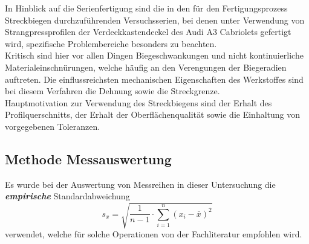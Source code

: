 \documentclass[12pt,a4paper,parskip,twoside,BCOR5mm,headsepline]{scrartcl}
\begin{document}
In Hinblick auf die Serienfertigung sind die in den für den Fertigungsprozess  Streckbiegen durchzuführenden Versuchsserien, bei denen unter Verwendung von Strangpressprofilen der Verdeckkastendeckel des Audi A3 Cabriolets gefertigt wird, spezifische Problembereiche besonders zu beachten.\\
Kritisch sind hier vor allen Dingen Biegeschwankungen und nicht kontinuierliche Materialeinschnürungen,  welche häufig an den Verengungen der Biegeradien auftreten. Die einflussreichsten mechanischen Eigenschaften des Werkstoffes sind bei diesem Verfahren die Dehnung sowie die Streckgrenze.\\
Hauptmotivation zur Verwendung des Streckbiegens sind der Erhalt des Profilquerschnitts, der Erhalt der Oberflächenqualität sowie die Einhaltung von vorgegebenen Toleranzen. 














  











\subsection{Methode Messauswertung}
Es wurde bei der Auswertung von Messreihen in dieser Untersuchung  die \textbf{\emph{empirische}} Standardabweichung 
\begin{equation}
 s_x = \sqrt{\frac{1}{n-1} \cdot \sum \limits_{i=1}^n (x_i - \bar{x})^2} 
\end{equation}  verwendet, welche für solche Operationen von der Fachliteratur empfohlen wird.\\        
  \autocite[301]{mf} 
\end{document}

